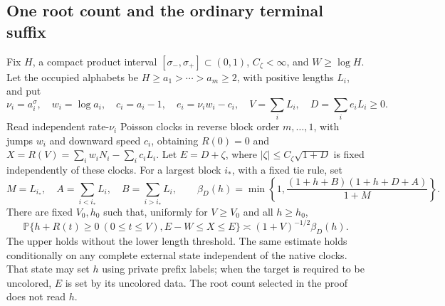 \subsection{One root count and the ordinary terminal suffix}

\begin{theorem}
\label{bridge:ordinary-root}
Fix $H$, a compact product interval $[\sigma_-,\sigma_+]\subset(0,1)$,
$C_\zeta<\infty$, and $W\ge\log H$. Let the occupied alphabets be
$H\ge a_1>\cdots>a_m\ge2$, with positive lengths $L_i$, and put
\[
 \nu_i=a_i^\sigma,\quad w_i=\log a_i,\quad c_i=a_i-1,\quad
 e_i=\nu_iw_i-c_i,\quad V=\sum_iL_i,\quad D=\sum_ie_iL_i\ge0.
\]
Read independent rate-$\nu_i$ Poisson clocks in reverse block order
$m,\ldots,1$, with jumps $w_i$ and downward speed $c_i$, obtaining
$R(0)=0$ and
$X=R(V)=\sum_iw_iN_i-\sum_ic_iL_i$.
Let $E=D+\zeta$, where $|\zeta|\le C_\zeta\sqrt{1+D}$ is fixed
independently of these clocks. For a largest block $i_*$, with a fixed
tie rule, set
\[
 M=L_{i_*},\quad A=\sum_{i<i_*}L_i,\quad B=\sum_{i>i_*}L_i,
 \qquad
 \beta_D(h)=\min\left\{1,
       \frac{(1+h+B)(1+h+D+A)}{1+M}\right\}.
\]
There are fixed $V_0,h_0$ such that, uniformly for $V\ge V_0$ and
all $h\ge h_0$,
\begin{equation}
 \mathbb P\{h+R(t)\ge0\ (0\le t\le V), E-W\le X\le E\}
       \asymp (1+V)^{-1/2}\beta_D(h).
 \label{bridge:root-factor}
\end{equation}
The upper holds without the lower length threshold. The same estimate
holds conditionally on any complete external state independent of the
native clocks. That state may set $h$ using private prefix labels;
when the target is required to be uncolored, $E$ is set by its
uncolored data. The root count selected in the proof does not read $h$.
\end{theorem}
